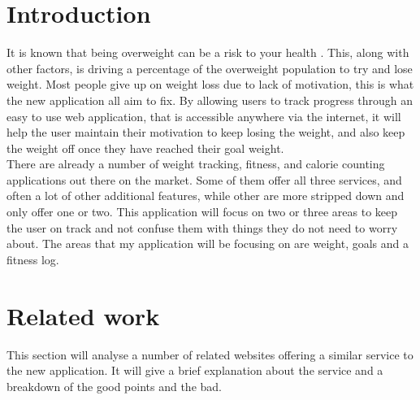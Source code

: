\section{Introduction}
It is known that being overweight can be a risk to your health \citep{theordre:1985}. This, along with other factors, is driving a percentage of the overweight population to try and lose weight. Most people give up on weight loss due to lack of motivation, this is what the new application all aim to fix. By allowing users to track progress through an easy to use web application, that is accessible anywhere via the internet, it will help the user maintain their motivation to keep losing the weight, and also keep the weight off once they have reached their goal weight.\\

There are already a number of weight tracking, fitness, and calorie counting applications out there on the market. Some of them offer all three services, and often a lot of other additional features, while other are more stripped down and only offer one or two. This application will focus on two or three areas to keep the user on track and not confuse them with things they do not need to worry about. The areas that my application will be focusing on are weight, goals and a fitness log.

\section{Related work}
This section will analyse a number of related websites offering a similar service to the new application. It will give a brief explanation about the service and a breakdown of the good points and the bad.

